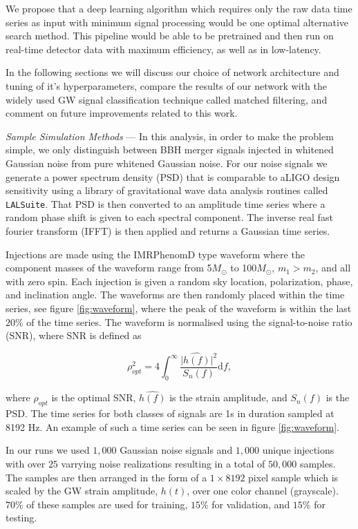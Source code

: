 \documentclass[%
 amsmath,amssymb,
 aps,
 twocolumn,
 prl,
 reprint,
floatfix,
]{revtex4-1}
\begin{document}
We propose that a deep learning algorithm which requires only the raw data time series as input with minimum signal processing would be one optimal alternative search method. This pipeline would be able to be pretrained and then run on real-time detector data with maximum efficiency, as well as in low-latency.

In the following sections we will discuss our choice of network architecture and tuning of it's hyperparameters, compare the results of our network with the widely used GW signal classification technique called matched filtering, and comment on future improvements related to this work.      

\textit{Sample Simulation Methods} --- In this analysis, in order to make the problem simple, we only distinguish between BBH merger signals injected in whitened Gaussian noise from pure whitened Gaussian noise. For our noise signals we generate a power spectrum density (PSD) that is comparable to aLIGO design sensitivity using a library of gravitational wave data analysis routines called \texttt{LALSuite}. That PSD is then converted to an amplitude time series where a random phase shift is given to each spectral component. The inverse real fast fourier transform (IFFT) is then applied and returns a Gaussian time series.

Injections are made using the IMRPhenomD type waveform \cite{PhysRevD.93.044006, PhysRevD.93.044007} where the component masses of the waveform range from 5\(M_\odot\) to 100\(M_\odot\), $m_{1} > m_{2}$, and all with zero spin. Each injection is given a random sky location, polarization, phase, and inclination angle. The waveforms are then randomly placed within the time series, see figure \ref{fig:waveform}, where the peak of the waveform is within the last $20$\% of the time series. The waveform is normalised using the signal-to-noise ratio (SNR), where SNR is defined as

\begin{equation} \label{eq:snr}
\rho_{opt}^{2} = 4 \int_{0}^{\infty} \frac{\lvert \hat{h(f)}\rvert^{2}}{S_{n}(f)} \mathrm{d}f,
\end{equation}

where $\rho_{opt}$ is the optimal SNR, $\hat{h(f)}$ is the strain amplitude, and $S_{n}(f)$ is the PSD. The time series for both classes of signals are 1s in duration sampled at 8192 Hz. An example of such a time series can be seen in figure \ref{fig:waveform}. 

In our runs we used $1,000$ Gaussian noise signals and $1,000$ unique injections with over $25$ varrying noise realizations resulting in a total of $50,000$ samples. The samples are then arranged in the form of a $1 \times 8192$ pixel sample which is scaled by the GW strain amplitude, $h(t)$, over one color channel (grayscale). $70\%$ of these samples are used for training, $15\%$ for validation, and $15\%$ for testing. 
\end{document}

